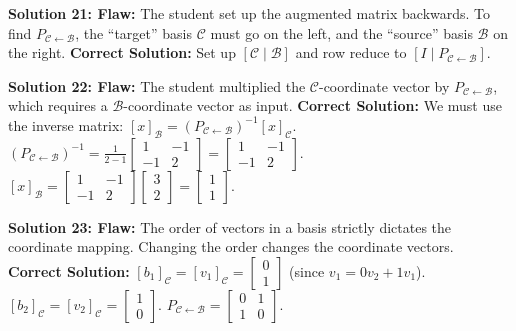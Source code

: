 \documentclass[11pt]{article}
\begin{document}
\vspace{0.5cm}
\textbf{Solution 21: Flaw:} The student set up the augmented matrix backwards. To find $P_{\mathcal{C} \leftarrow \mathcal{B}}$, the ``target'' basis $\mathcal{C}$ must go on the left, and the ``source'' basis $\mathcal{B}$ on the right. \textbf{Correct Solution:} Set up $[\mathcal{C} \mid \mathcal{B}]$ and row reduce to $[I \mid P_{\mathcal{C} \leftarrow \mathcal{B}}]$.

\vspace{0.5cm}
\textbf{Solution 22: Flaw:} The student multiplied the $\mathcal{C}$-coordinate vector by $P_{\mathcal{C} \leftarrow \mathcal{B}}$, which requires a $\mathcal{B}$-coordinate vector as input. \textbf{Correct Solution:} We must use the inverse matrix: $[x]_{\mathcal{B}} = (P_{\mathcal{C} \leftarrow \mathcal{B}})^{-1} [x]_{\mathcal{C}}$.
$(P_{\mathcal{C} \leftarrow \mathcal{B}})^{-1} = \frac{1}{2-1} \begin{bmatrix} 1 & -1 \\ -1 & 2 \end{bmatrix} = \begin{bmatrix} 1 & -1 \\ -1 & 2 \end{bmatrix}$.
$[x]_{\mathcal{B}} = \begin{bmatrix} 1 & -1 \\ -1 & 2 \end{bmatrix} \begin{bmatrix} 3 \\ 2 \end{bmatrix} = \begin{bmatrix} 1 \\ 1 \end{bmatrix}$.

\vspace{0.5cm}
\textbf{Solution 23: Flaw:} The order of vectors in a basis strictly dictates the coordinate mapping. Changing the order changes the coordinate vectors. \textbf{Correct Solution:}
$[b_1]_{\mathcal{C}} = [v_1]_{\mathcal{C}} = \begin{bmatrix} 0 \\ 1 \end{bmatrix}$ (since $v_1 = 0v_2 + 1v_1$).
$[b_2]_{\mathcal{C}} = [v_2]_{\mathcal{C}} = \begin{bmatrix} 1 \\ 0 \end{bmatrix}$.
$P_{\mathcal{C} \leftarrow \mathcal{B}} = \begin{bmatrix} 0 & 1 \\ 1 & 0 \end{bmatrix}$.
\end{document}
